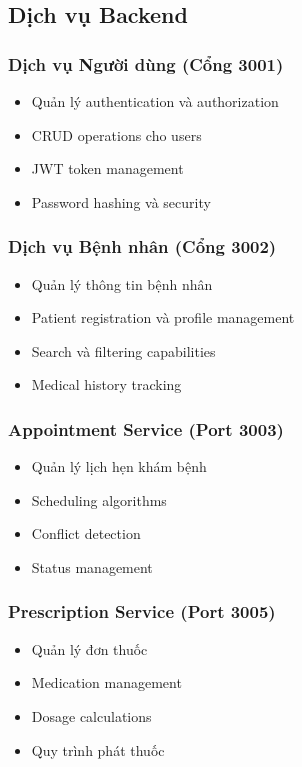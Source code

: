 \documentclass[12pt,a4paper]{report}
\begin{document}
    \subsection{Dịch vụ Backend}
    \subsubsection{Dịch vụ Người dùng (Cổng 3001)}
    \begin{itemize}
        \item Quản lý authentication và authorization
        \item CRUD operations cho users
        \item JWT token management
        \item Password hashing và security
    \end{itemize}

    \subsubsection{Dịch vụ Bệnh nhân (Cổng 3002)}
    \begin{itemize}
        \item Quản lý thông tin bệnh nhân
        \item Patient registration và profile management
        \item Search và filtering capabilities
        \item Medical history tracking
    \end{itemize}

    \subsubsection{Appointment Service (Port 3003)}
    \begin{itemize}
        \item Quản lý lịch hẹn khám bệnh
        \item Scheduling algorithms
        \item Conflict detection
        \item Status management
    \end{itemize}

    \subsubsection{Prescription Service (Port 3005)}
    \begin{itemize}
        \item Quản lý đơn thuốc
        \item Medication management
        \item Dosage calculations
        \item Quy trình phát thuốc
    \end{itemize}
\end{document}
